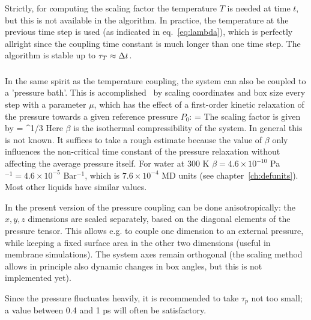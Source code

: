 Strictly,  for computing the scaling factor the temperature $T$ is
needed at time $t$, but this is not available in the algorithm. In
practice, the temperature at the previous time step is used (as
indicated in eq.~\ref{eq:lambda}), which is
perfectly allright since the coupling time constant is much longer
than one time step. The algorithm is stable up to $\tau_T \approx {\Delta t}$.

\subsubsection*{}
In the same spirit as the temperature coupling, the system can also be
coupled to a 'pressure bath'. 
This is accomplished~\cite{Berendsen84} by scaling
coordinates and box size every step with a parameter $\mu$, which has
the effect of a first-order kinetic relaxation of the pressure towards
a given reference pressure $P_0$:
\beq
{} = 
\eeq
The scaling factor is given by
\beq
\mu = ^{1/3}
\label{eq:mu}
\eeq
Here $\beta$ is the isothermal compressibility of the system. In general
this is not known. It suffices to take a rough estimate because the
value of $\beta$ only influences the non-critical time constant of the
pressure relaxation without affecting the average pressure itself. For
water at 300 K 
$\beta = 4.6 \times 10^{-10}$ Pa$^{-1} = 4.6 \times 10^{-5}$ Bar$^{-1}$,
which is $7.6 \times 10^{-4}$ MD units (see chapter~\ref{ch:defunits}).
Most other liquids have similar values.

In the present version of \gromacs the pressure coupling can be done
anisotropically: the $x,y,z$ dimensions are scaled separately, based
on the diagonal elements of the pressure tensor. This allows e.g.  to couple
one dimension to an external pressure, while keeping a fixed surface
area in the other two dimensions (useful in membrane simulations). The
system  axes remain orthogonal (the scaling method allows in principle
also  dynamic changes in box angles, but this is not implemented yet).

Since the pressure fluctuates heavily, it is recommended to take
$\tau_p$ not too small; a value between 0.4 and 1 ps will often be
satisfactory.

